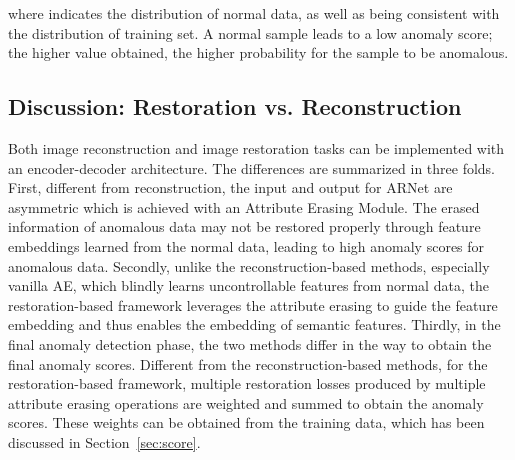 \documentclass[journal]{IEEEtran}
\begin{document}
where  indicates the distribution of normal data, as well as being consistent with the distribution of training set. A normal sample leads to a low anomaly score; the higher value   obtained, the higher probability for the sample  to be anomalous.


\subsection{Discussion: Restoration vs. Reconstruction}

Both image reconstruction and image restoration tasks can be implemented with an encoder-decoder architecture. The differences are summarized in three folds. First, different from reconstruction, the input and output for ARNet are asymmetric which is achieved with an Attribute Erasing Module.
The erased information of anomalous data may not be restored properly through feature embeddings learned from the normal data, leading to high anomaly scores for anomalous data. 
Secondly, unlike the reconstruction-based methods, especially vanilla AE, which blindly learns uncontrollable features from normal data, the restoration-based framework leverages the attribute erasing to guide the feature embedding and thus enables the embedding of semantic features. 
Thirdly, in the final anomaly detection phase, the two methods differ in the way to obtain the final anomaly scores. Different from the reconstruction-based methods, for the restoration-based framework, multiple restoration losses produced by multiple attribute erasing operations are weighted and summed to obtain the anomaly scores. These weights can be obtained from the training data, which has been discussed in Section~\ref{sec:score}.
\end{document}
